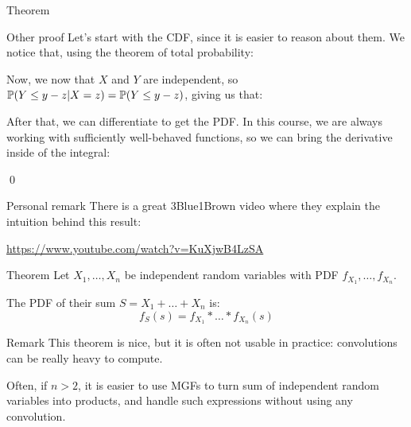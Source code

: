 \documentclass[a4paper]{article}
\begin{document}
\begin{parag}{Theorem}
\begin{subparag}{Other proof}
        Let's start with the CDF, since it is easier to reason about them. We notice that, using the theorem of total probability: 
        
        Now, we now that $X$ and $Y$ are independent, so $\prob\left(Y \leq y-z | X = z\right) = \prob\left(Y \leq y- z\right)$, giving us that: 
        
        After that, we can differentiate to get the PDF. In this course, we are always working with sufficiently well-behaved functions, so we can bring the derivative inside of the integral: 
        
        \qed
    \end{subparag}
    

    \begin{subparag}{Personal remark}
        There is a great 3Blue1Brown video where they explain the intuition behind this result:
        \begin{center}
            \url{https://www.youtube.com/watch?v=KuXjwB4LzSA}
        \end{center}
    \end{subparag}
\end{parag}

\begin{parag}{Theorem}
    Let $X_1, \ldots, X_n$ be independent random variables with PDF $f_{X_1}, \ldots, f_{X_n}$.

    The PDF of their sum $S = X_1 + \ldots + X_n$ is: 
    \[f_S\left(s\right) = f_{X_1} * \ldots * f_{X_n}\left(s\right)\]
    
    \begin{subparag}{Remark}
        This theorem is nice, but it is often not usable in practice: convolutions can be really heavy to compute. 

        Often, if $n > 2$, it is easier to use MGFs to turn sum of independent random variables into products, and handle such expressions without using any convolution.
    \end{subparag}
\end{parag}
\end{document}

